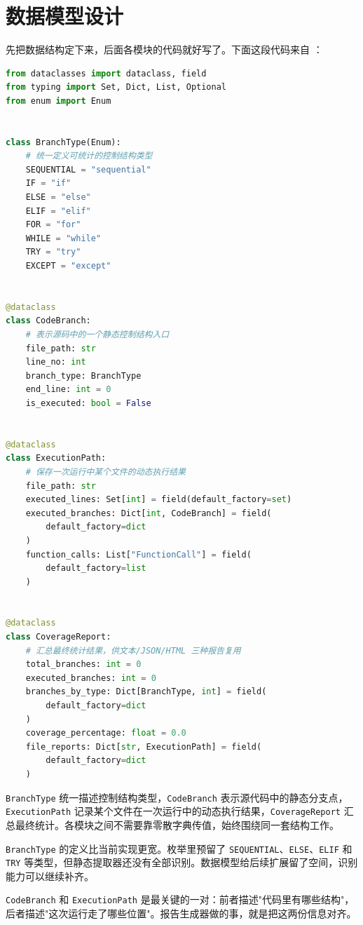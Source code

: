 \section{数据模型设计}

先把数据结构定下来，后面各模块的代码就好写了。下面这段代码来自 ：

\begin{lstlisting}[language=Python, caption={PathTracer 的核心数据模型}]
from dataclasses import dataclass, field
from typing import Set, Dict, List, Optional
from enum import Enum


class BranchType(Enum):
    # 统一定义可统计的控制结构类型
    SEQUENTIAL = "sequential"
    IF = "if"
    ELSE = "else"
    ELIF = "elif"
    FOR = "for"
    WHILE = "while"
    TRY = "try"
    EXCEPT = "except"


@dataclass
class CodeBranch:
    # 表示源码中的一个静态控制结构入口
    file_path: str
    line_no: int
    branch_type: BranchType
    end_line: int = 0
    is_executed: bool = False


@dataclass
class ExecutionPath:
    # 保存一次运行中某个文件的动态执行结果
    file_path: str
    executed_lines: Set[int] = field(default_factory=set)
    executed_branches: Dict[int, CodeBranch] = field(
        default_factory=dict
    )
    function_calls: List["FunctionCall"] = field(
        default_factory=list
    )


@dataclass
class CoverageReport:
    # 汇总最终统计结果，供文本/JSON/HTML 三种报告复用
    total_branches: int = 0
    executed_branches: int = 0
    branches_by_type: Dict[BranchType, int] = field(
        default_factory=dict
    )
    coverage_percentage: float = 0.0
    file_reports: Dict[str, ExecutionPath] = field(
        default_factory=dict
    )
\end{lstlisting}

\texttt{BranchType} 统一描述控制结构类型，\texttt{CodeBranch} 表示源代码中的静态分支点，\texttt{ExecutionPath} 记录某个文件在一次运行中的动态执行结果，\texttt{CoverageReport} 汇总最终统计。各模块之间不需要靠零散字典传值，始终围绕同一套结构工作。

\texttt{BranchType} 的定义比当前实现更宽。枚举里预留了 \texttt{SEQUENTIAL}、\texttt{ELSE}、\texttt{ELIF} 和 \texttt{TRY} 等类型，但静态提取器还没有全部识别。数据模型给后续扩展留了空间，识别能力可以继续补齐。

\texttt{CodeBranch} 和 \texttt{ExecutionPath} 是最关键的一对：前者描述"代码里有哪些结构"，后者描述"这次运行走了哪些位置"。报告生成器做的事，就是把这两份信息对齐。

